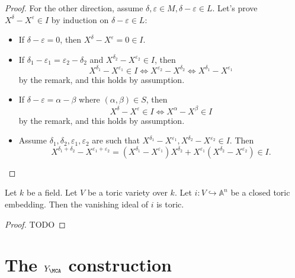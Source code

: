 \begin{proof}
  For the other direction, assume $\delta, \varepsilon \in M, \delta - \varepsilon \in L$.
  Let's prove $X^\delta - X^\varepsilon \in I$ by induction on $\delta - \varepsilon \in L$:
  \begin{itemize}
    \item If $\delta - \varepsilon = 0$, then $X^\delta - X^\varepsilon = 0 \in I$.
    \item If $\delta_1 - \varepsilon_1 = \varepsilon_2 - \delta_2$
      and $X^{\delta_2} - X^{\varepsilon_2} \in I$, then
      \[
        X^{\delta_1} - X^{\varepsilon_1} \in I \iff X^{\varepsilon_2} - X^{\delta_2}
          \iff X^{\delta_1} - X^{\varepsilon_1}
      \]
      by the remark, and this holds by assumption.
    \item If $\delta - \varepsilon = \alpha - \beta$ where $(\alpha, \beta) \in S$, then
      \[
        X^\delta - X^\varepsilon \in I \iff X^\alpha - X^\beta \in I
      \]
      by the remark, and this holds by assumption.
    \item Assume $\delta_1, \delta_2, \varepsilon_1, \varepsilon_2$ are such that
      $X^{\delta_1} - X^{\varepsilon_1}, X^{\delta_2} - X^{\varepsilon_2} \in I$.
      Then
      \[
        X^{\delta_1 + \delta_2} - X^{\varepsilon_1 + \varepsilon_2}
          = (X^{\delta_1} - X^{\varepsilon_1})X^{\delta_2}
            + X^{\varepsilon_1}(X^{\delta_2} - X^{\varepsilon_2})
          \in I.
      \]
  \end{itemize}
\end{proof}


\begin{proposition}
  \label{5-3-van-tor-emb}

  Let $k$ be a field.
  Let $V$ be a toric variety over $k$.
  Let $i : V \hookrightarrow \mathbb{A}^n$ be a closed toric embedding.
  Then the vanishing ideal of $i$ is toric.
\end{proposition}
\begin{proof}

  TODO
\end{proof}


\section{The \texorpdfstring{$Y_\MCA$}{YA} construction}


